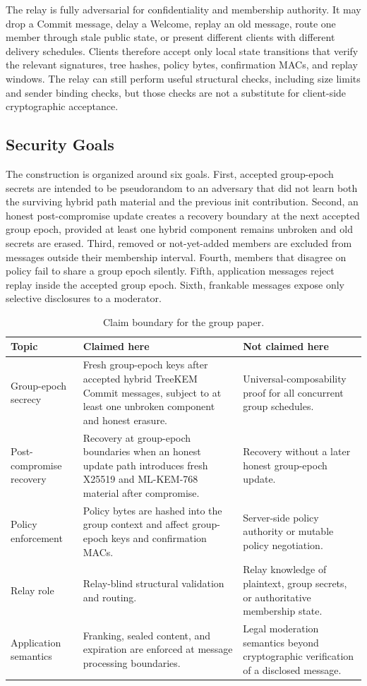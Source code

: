 \documentclass[preprint,12pt]{elsarticle}
\theoremstyle{definition}
\newcommand{\tech}[1]{\textnormal{#1}}
\renewcommand{\DH}{\tech{X25519}}
\newcommand{\KEM}{\tech{ML-KEM-768}}
\begin{document}
The relay is fully adversarial for confidentiality and membership authority.
It may drop a Commit message, delay a Welcome, replay an old message, route one member
through stale public state, or present different clients with different
delivery schedules. Clients therefore accept only local state transitions that
verify the relevant signatures, tree hashes, policy bytes, confirmation MACs,
and replay windows. The relay can still perform useful structural checks,
including size limits and sender binding checks, but those checks are not a
substitute for client-side cryptographic acceptance.

\subsection{Security Goals}

The construction is organized around six goals. First, accepted group-epoch secrets
are intended to be pseudorandom to an adversary that did not learn both the
surviving hybrid path material and the previous init contribution. Second, an
honest post-compromise update creates a recovery boundary at the next accepted
group epoch, provided at least one hybrid component remains unbroken and old secrets
are erased. Third, removed or not-yet-added members are excluded from messages
outside their membership interval. Fourth, members that disagree on policy fail
to share a group epoch silently. Fifth, application messages reject replay inside
the accepted group epoch. Sixth, frankable messages expose only selective
disclosures to a moderator.

\begin{table}[tbp]
\centering
\caption{Claim boundary for the group paper.}\label{tab:scope}
\footnotesize
\begin{tabularx}{\textwidth}{@{}p{}YY@{}}
\toprule
Topic & Claimed here & Not claimed here \\
\midrule
Group-epoch secrecy & Fresh group-epoch keys after accepted hybrid TreeKEM Commit messages, subject to at least one unbroken component and honest erasure. & Universal-composability proof for all concurrent group schedules. \\
Post-compromise recovery & Recovery at group-epoch boundaries when an honest update path introduces fresh \DH{} and \KEM{} material after compromise. & Recovery without a later honest group-epoch update. \\
Policy enforcement & Policy bytes are hashed into the group context and affect group-epoch keys and confirmation MACs. & Server-side policy authority or mutable policy negotiation. \\
Relay role & Relay-blind structural validation and routing. & Relay knowledge of plaintext, group secrets, or authoritative membership state. \\
Application semantics & Franking, sealed content, and expiration are enforced at message processing boundaries. & Legal moderation semantics beyond cryptographic verification of a disclosed message. \\
\bottomrule
\end{tabularx}
\end{table}
\end{document}
